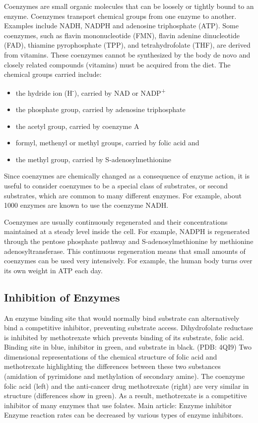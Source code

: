 Coenzymes are small organic molecules that can be loosely or tightly bound to an enzyme. Coenzymes transport chemical groups from one enzyme to another. Examples include NADH, NADPH and adenosine triphosphate (ATP). Some coenzymes, such as flavin mononucleotide (FMN), flavin adenine dinucleotide (FAD), thiamine pyrophosphate (TPP), and tetrahydrofolate (THF), are derived from vitamins. These coenzymes cannot be synthesized by the body de novo and closely related compounds (vitamins) must be acquired from the diet. The chemical groups carried include:

\begin{itemize}
\tightlist
\item
  the hydride ion (H\textsuperscript{-}), carried by NAD or NADP\textsuperscript{+}
\item
  the phosphate group, carried by adenosine triphosphate
\item
  the acetyl group, carried by coenzyme A
\item
  formyl, methenyl or methyl groups, carried by folic acid and
\item
  the methyl group, carried by S-adenosylmethionine
\end{itemize}

Since coenzymes are chemically changed as a consequence of enzyme action, it is useful to consider coenzymes to be a special class of substrates, or second substrates, which are common to many different enzymes. For example, about 1000 enzymes are known to use the coenzyme NADH.

Coenzymes are usually continuously regenerated and their concentrations maintained at a steady level inside the cell. For example, NADPH is regenerated through the pentose phosphate pathway and S-adenosylmethionine by methionine adenosyltransferase. This continuous regeneration means that small amounts of coenzymes can be used very intensively. For example, the human body turns over its own weight in ATP each day.

\hypertarget{inhibition-of-enzymes}{%
\subsection{Inhibition of Enzymes}\label{inhibition-of-enzymes}}

An enzyme binding site that would normally bind substrate can alternatively bind a competitive inhibitor, preventing substrate access. Dihydrofolate reductase is inhibited by methotrexate which prevents binding of its substrate, folic acid. Binding site in blue, inhibitor in green, and substrate in black. (PDB: 4QI9​)
Two dimensional representations of the chemical structure of folic acid and methotrexate highlighting the differences between these two substances (amidation of pyrimidone and methylation of secondary amine).
The coenzyme folic acid (left) and the anti-cancer drug methotrexate (right) are very similar in structure (differences show in green). As a result, methotrexate is a competitive inhibitor of many enzymes that use folates.
Main article: Enzyme inhibitor
Enzyme reaction rates can be decreased by various types of enzyme inhibitors.

